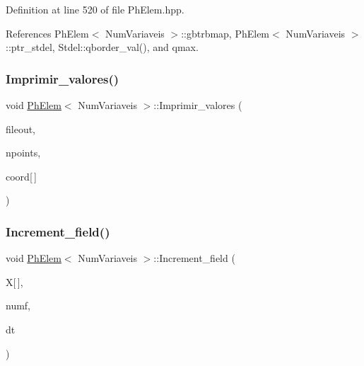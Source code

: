 Definition at line 520 of file Ph\+Elem.\+hpp.



References Ph\+Elem$<$ Num\+Variaveis $>$\+::gbtrbmap, Ph\+Elem$<$ Num\+Variaveis $>$\+::ptr\+\_\+stdel, Stdel\+::qborder\+\_\+val(), and qmax.

\mbox{\label{classPhElem_a6f8258d7b66de04cd4d88f2c8af41541}} 
\subsubsection{\texorpdfstring{Imprimir\+\_\+valores()}{Imprimir\_valores()}}
{\footnotesize\ttfamily void \hyperlink{classPhElem}{Ph\+Elem}$<$ Num\+Variaveis $>$\+::Imprimir\+\_\+valores (\begin{DoxyParamCaption}\item[{F\+I\+LE $\ast$}]{fileout,  }\item[{const int \&}]{npoints,  }\item[{const double}]{coord\mbox{[}$\,$\mbox{]} }\end{DoxyParamCaption})\hspace{0.3cm}{\ttfamily [inherited]}}

\mbox{\label{classPhElem_afac13525ce0e8907ca74a7213aa72504}} 
\subsubsection{\texorpdfstring{Increment\+\_\+field()}{Increment\_field()}}
{\footnotesize\ttfamily void \hyperlink{classPhElem}{Ph\+Elem}$<$ Num\+Variaveis $>$\+::Increment\+\_\+field (\begin{DoxyParamCaption}\item[{const double}]{X\mbox{[}$\,$\mbox{]},  }\item[{const int \&}]{numf,  }\item[{const double}]{dt }\end{DoxyParamCaption})\hspace{0.3cm}{\ttfamily [inherited]}}

\mbox{\label{classDG__Elem_af61130ab38851fa2ade53f9e3f2418bc}} 
